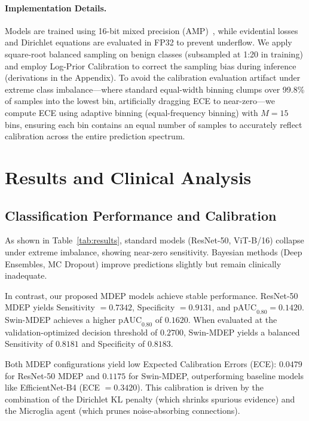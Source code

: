 \documentclass[letterpaper]{article} %
\begin{document}
\paragraph{Implementation Details.} Models are trained using 16-bit mixed precision (AMP)~\cite{micikevicius2018mixed}, while evidential losses and Dirichlet equations are evaluated in FP32 to prevent underflow. We apply square-root balanced sampling on benign classes (subsampled at 1:20 in training) and employ Log-Prior Calibration to correct the sampling bias during inference (derivations in the Appendix). To avoid the calibration evaluation artifact under extreme class imbalance—where standard equal-width binning clumps over 99.8\% of samples into the lowest bin, artificially dragging ECE to near-zero—we compute ECE using adaptive binning (equal-frequency binning) with $M=15$ bins, ensuring each bin contains an equal number of samples to accurately reflect calibration across the entire prediction spectrum.

\section{Results and Clinical Analysis}\label{sec:results}

\subsection{Classification Performance and Calibration}
As shown in Table~\ref{tab:results}, standard models (ResNet-50, ViT-B/16) collapse under extreme imbalance, showing near-zero sensitivity. Bayesian methods (Deep Ensembles, MC Dropout) improve predictions slightly but remain clinically inadequate. 

In contrast, our proposed MDEP models achieve stable performance. ResNet-50 MDEP yields Sensitivity $= 0.7342$, Specificity $= 0.9131$, and $\text{pAUC}_{0.80} = 0.1420$. Swin-MDEP achieves a higher $\text{pAUC}_{0.80}$ of $0.1620$. When evaluated at the validation-optimized decision threshold of $0.2700$, Swin-MDEP yields a balanced Sensitivity of $0.8181$ and Specificity of $0.8183$. 

Both MDEP configurations yield low Expected Calibration Errors (ECE): $0.0479$ for ResNet-50 MDEP and $0.1175$ for Swin-MDEP, outperforming baseline models like EfficientNet-B4 (ECE $= 0.3420$). This calibration is driven by the combination of the Dirichlet KL penalty (which shrinks spurious evidence) and the Microglia agent (which prunes noise-absorbing connections). 
\end{document}
